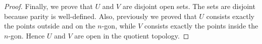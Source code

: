 \documentclass{article}
\begin{document}
\begin{enumerate}
\begin{enumerate}
\begin{proof}
          Finally, we prove that $U$ and $V$ are disjoint open sets. The
          sets are disjoint because parity is well-defined. Also,
          previously we proved that $U$ consists exactly the points outside
          and on the $n$-gon, while $V$ consists exactly the points inside
          the $n$-gon. Hence $U$ and $V$ are open in the quotient topology. 
        \end{proof}
    \end{enumerate}
\end{enumerate}
\end{document}
